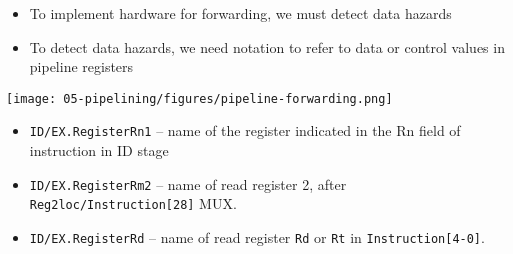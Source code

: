 \ifnum{}\fi

\begin{frame}[fragile]
\begin{itemize}
\item To implement hardware for forwarding, we must detect data hazards 
\item To detect data hazards, we need notation to refer to data or control values in pipeline registers
\end{itemize}

\begin{multicols}{2}
    \texttt{[image: 05-pipelining/figures/pipeline-forwarding.png]}
\columnbreak

\begin{itemize}
\item {\tt ID/EX.RegisterRn1} -- name of the register indicated in
  the Rn field of instruction in ID stage
  \item {\tt ID/EX.RegisterRm2} -- name of read register 2, after {\tt Reg2loc/Instruction[28]} MUX. 
  \item {\tt ID/EX.RegisterRd} -- name of read register {\tt Rd} or {\tt Rt} in {\tt Instruction[4-0]}. 
\end{itemize}

\end{multicols}

\end{frame}





